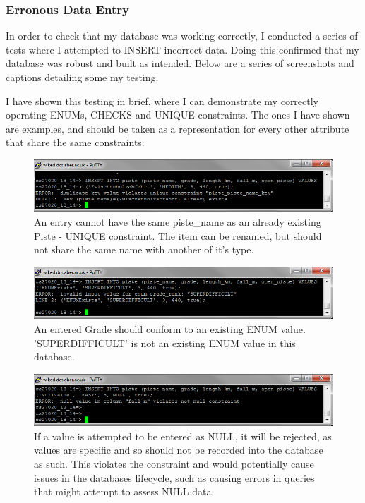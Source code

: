 \documentclass[11pt]{scrartcl} %
\begin{document}
\subsubsection{Erronous Data Entry}
In order to check that my database was working correctly, I conducted a series of tests where I attempted to INSERT incorrect data. Doing this confirmed that my database was robust and built as intended. Below are a series of screenshots and captions detailing some my testing.

 I have shown this testing in brief, where I can demonstrate my correctly operating ENUMs, CHECKS and UNIQUE constraints. The ones I have shown are examples, and should be taken as a representation for every other attribute that share the same constraints.

\begin{figure}[H]
  \centering
    \includegraphics[width=1\textwidth]{IMG/err_exists.png}
 \caption{An entry cannot have the same piste\_name as an already existing Piste - UNIQUE constraint. The item can be renamed, but should not share the same name with another of it's type.}
\end{figure}
\begin{figure}[H]
  \centering
    \includegraphics[width=1\textwidth]{IMG/err_no_enum.png}
 \caption{An entered Grade should conform to an existing ENUM value. 'SUPERDIFFICULT' is not an existing ENUM value in this database.}
\end{figure}
\begin{figure}[H]
  \centering
    \includegraphics[width=1\textwidth]{IMG/err_null_value.png}
 \caption{If a value is attempted to be entered as NULL, it will be rejected, as values are specific and so should not be recorded into the database as such. This violates the constraint and would potentially cause issues in the databases lifecycle, such as causing errors in queries that might attempt to assess NULL data.}
\end{figure}
\end{document}

